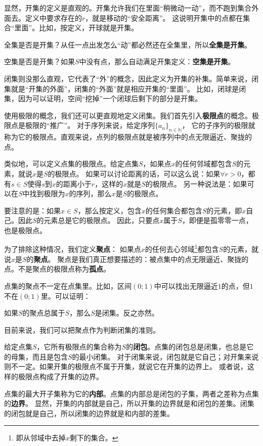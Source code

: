 \documentclass[12pt,UTF8]{ctexbook}
\begin{document}
显然，开集的定义是直观的。开集允许我们在里面“稍微动一动”，而不跑到集合外面去。定义中要求存在的$r$，就是移动的“安全距离”。
这说明开集中的点都在集合“里面”。比如，按定义，开球就是开集。

全集是否是开集？从任一点出发怎么“动”都必然还在全集里，所以\textbf{全集是开集}。

空集是否是开集？如果$S$中没有点，那么自动满足开集定义：\textbf{空集是开集}。

闭集则没那么直观，它代表了“外”的概念，因此定义为开集的补集。简单来说，闭集就是“开集的外面”，闭集的“外面”就是相应开集的“里面”。
比如，闭球是闭集，因为可以证明，空间“挖掉”一个闭球后剩下的部分是开集。

使用极限的概念，我们还可以更直观地定义闭集。我们首先引入\textbf{极限点}的概念。极限点是极限的“推广”。
对于序列来说，给定序列$\{a_n\}_{n\in\mathbb{N}}$，
它的子序列的极限就称为它的极限点。直观来说，点列的极限点就是被序列中的点无限逼近、聚拢的点。

类似地，可以定义点集的极限点。给定点集$S$，如果点$x$的任何邻域都包含$S$的元素，就说$x$是$S$的极限点。
如果可以讨论距离的话，可以这么说：如果$\forall r>0$，都有$s\in S$使得$s$到$x$的距离小于$r$，这样的$x$就是$S$的极限点。
另一种说法是：如果可以在$S$中找到极限为$x$的序列，那么$x$是$S$的极限点。

要注意的是：如果$x\in S$，那么按定义，包含$x$的任何集合都包含$S$的元素，即$x$自己。因此$S$的元素总是它的极限点。
因此，只要点$x$属于$S$，即便是孤零零一点，也是极限点。

为了排除这种情况，我们定义\textbf{聚点}：
如果点$x$的任何去心邻域\footnote{即从邻域中去掉$x$剩下的集合。}都包含$S$的元素，就说$x$是$S$的\textbf{聚点}。
聚点是我们真正想要描述的：被点集中的点无限逼近、聚拢的点。不是聚点的极限点称为\textbf{孤点}。

点集的聚点不一定在点集里。比如，区间$(0;1)$中可以找出无限逼近$1$的点，但$1$不在$(0;1)$里。可以证明：
\begin{tm}
    如果$S$的聚点总属于$S$，那么$S$是闭集。反之亦然。
\end{tm}

目前来说，我们可以把聚点作为判断闭集的准则。

给定点集$S$，它所有极限点的集合称为$S$的\textbf{闭包}。点集的闭包总是闭集，也总是它的母集，而且是包含$S$的最小闭集。
对于闭集来说，闭包就是它自己；对开集来说则不一定。如果开集的极限点不属于开集，就说它在开集的边界上。
或者说，这样的极限点构成了开集的边界。

点集的最大开子集称为它的\textbf{内部}。点集的内部总是闭包的子集，两者之差称为点集的\textbf{边界}。
显然，开集的内部就是自己，所以开集的边界就是和闭包的差集。闭集的闭包就是自己，所以闭集的边界就是和内部的差集。
\end{document}

